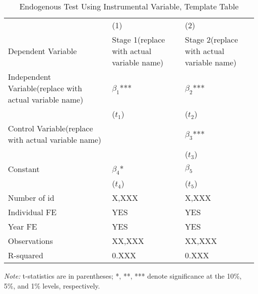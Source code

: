 \begin{table}[htbp]
\caption{Endogenous Test Using Instrumental Variable, Template Table}
\label{Use the regression name as the label}
\centering
\begin{tabular}{p{3.6cm}p{3.6cm}p{3.6cm}} %
\toprule
& (1) & (2) \\
Dependent Variable  & Stage 1(replace with actual variable name)  & Stage 2(replace with actual variable name)  \\
\midrule
Independent Variable(replace with actual variable name)   & $\beta_1$*** & $\beta_2$*** \\
            & ($t_1$) & ($t_2$) \\
Control Variable(replace with actual variable name)     &  & $\beta_3$*** \\  %
            &  & ($t_3$) \\
Constant    & $\beta_4$* & $\beta_5$ \\
            & ($t_4$) & ($t_5$) \\

Number of id       & X,XXX        & X,XXX \\
Individual FE      & YES          & YES \\
Year FE            & YES          & YES \\
Observations       & XX,XXX       & XX,XXX \\
R-squared          & 0.XXX        & 0.XXX \\
\bottomrule
\end{tabular}
\begin{tablenotes}
\small
\item \textit{Note:} t-statistics are in parentheses; *, **, *** denote significance at the 10\%, 5\%, and 1\% levels, respectively.
\end{tablenotes}
\end{table}


